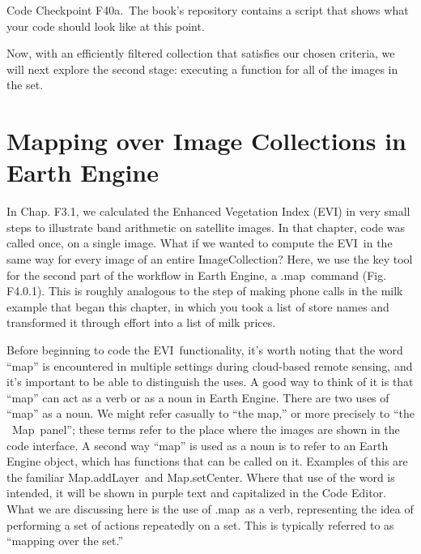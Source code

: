 \documentclass[
  letterpaper,
  DIV=11,
  numbers=noendperiod]{scrreprt}
\begin{document}
\begin{tcolorbox}[enhanced jigsaw, left=2mm, breakable, rightrule=.15mm, opacityback=0, colframe=quarto-callout-note-color-frame, colbacktitle=quarto-callout-note-color!10!white, arc=.35mm, opacitybacktitle=0.6, toptitle=1mm, colback=white, leftrule=.75mm, title=\textcolor{quarto-callout-note-color}{\faInfo}\hspace{0.5em}{Note}, toprule=.15mm, bottomtitle=1mm, titlerule=0mm, bottomrule=.15mm, coltitle=black]

Code Checkpoint F40a.~The book's repository contains a script that shows
what your code should look like at this point.

\end{tcolorbox}

Now, with an efficiently filtered collection that satisfies our chosen
criteria, we will next explore the second stage: executing a function
for all of the images in the set.

\hypertarget{mapping-over-image-collections-in-earth-engine}{%
\section{Mapping over Image Collections in Earth
Engine}\label{mapping-over-image-collections-in-earth-engine}}

In Chap. F3.1, we calculated the Enhanced Vegetation Index (EVI) in very
small steps to illustrate band arithmetic on satellite images. In that
chapter, code was called once, on a single image. What if we wanted to
compute the EVI~in the same way for every image of an entire
ImageCollection? Here, we use the key tool for the second part of the
workflow in Earth Engine, a .map~command (Fig. F4.0.1). This is roughly
analogous to the step of making phone calls in the milk example that
began this chapter, in which you took a list of store names and
transformed it through effort into a list of milk prices.

Before beginning to code the EVI~functionality, it's worth noting that
the word ``map'' is encountered in multiple settings during cloud-based
remote sensing, and it's important to be able to distinguish the uses. A
good way to think of it is that ``map'' can act as a verb or as a noun
in Earth Engine. There are two uses of ``map'' as a noun. We might refer
casually to ``the map,'' or more precisely to ``the ~Map~panel''; these
terms refer to the place where the images are shown in the code
interface. A second way ``map'' is used as a noun is to refer to an
Earth Engine object, which has functions that can be called on it.
Examples of this are the familiar Map.addLayer~and Map.setCenter. Where
that use of the word is intended, it will be shown in purple text and
capitalized in the Code Editor. What we are discussing here is the use
of .map~as a verb, representing the idea of performing a set of actions
repeatedly on a set. This is typically referred to as ``mapping over the
set.'' ~
\end{document}
